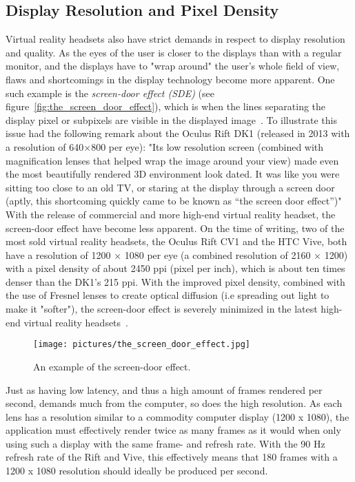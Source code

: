 \subsection{Display Resolution and Pixel Density}
Virtual reality headsets also have strict demands in respect to display resolution and quality. As the eyes of the user is closer
to the displays than with a regular monitor, and the displays have to "wrap around" the user's whole field of view, flaws and shortcomings in the display technology 
become more apparent. 
One such example is the \textit{screen-door effect (SDE)} (see figure~\vref{fig:the_screen_door_effect}), 
which is when the lines separating the display pixel or subpixels are visible in the displayed image~\citep{TC2016}. 
To illustrate this issue \citet{TC2016} had the following remark about the Oculus Rift DK1 (released in 2013 with a resolution of 640×800 per eye):
"Its low resolution screen (combined with magnification lenses that helped wrap the image around your view) made even the most beautifully rendered 3D environment look dated. 
It was like you were sitting too close to an old TV, or staring at the display through a screen door (aptly, this shortcoming quickly came to be known as “the screen door effect”)"
With the release of commercial and more high-end virtual reality headset, the screen-door effect have become less apparent.
On the time of writing, two of the most sold virtual reality headsets, the Oculus Rift CV1 and the HTC Vive, both have a resolution of 1200 × 1080 per eye (a combined 
resolution of 2160 × 1200) with a pixel density of about 2450 ppi (pixel per inch), which is about ten times denser than the DK1's 215 ppi. 
With the improved pixel density, combined with the use of Fresnel lenses to create optical diffusion (i.e spreading out light to make it "softer"), 
the screen-door effect is severely minimized in the latest high-end virtual reality headsets~\citep{Davies2016}. 

\begin{figure}%
	\texttt{[image: pictures/the\_screen\_door\_effect.jpg]}
	\caption[The screen-door effect]{An example of the screen-door effect.}
	\label{fig:the_screen_door_effect}
\end{figure} 

Just as having low latency, and thus a high amount of frames rendered per second, demands much from the computer, so does the high resolution.
As each lens has a resolution similar to a commodity computer display (1200 x 1080), the application must effectively render twice as many frames
as it would when only using such a display with the same frame- and refresh rate. With the 90 Hz refresh rate of the Rift and Vive, this effectively means
that 180 frames with a 1200 x 1080 resolution should ideally be produced per second.  

